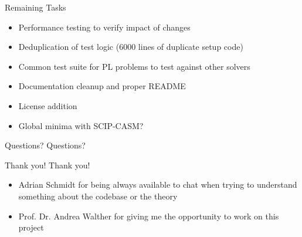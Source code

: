 \documentclass[aspectratio=169]{beamer}
\begin{document}
\begin{frame}{Remaining Tasks}
    \begin{itemize}[<+->]
        \item Performance testing to verify impact of changes
        \item Deduplication of test logic (6000 lines of duplicate setup code)
        \item Common test suite for PL problems to test against other solvers
        \item Documentation cleanup and proper README
        \item License addition
        \item Global minima with SCIP-CASM?
    \end{itemize}

\end{frame}

\begin{frame}{Questions?}
    \centering
    \vspace{2cm}
    \Huge Questions?
    \vspace{2cm}
\end{frame}

\begin{frame}{Thank you!}
    \centering
    \vspace{1cm}
    \Huge Thank you!
    \vspace{0.5cm}

    \large
    \begin{itemize}
        \item Adrian Schmidt for being always available to chat when trying to
              understand something about the codebase or the theory
        \item Prof. Dr. Andrea Walther for giving me the opportunity to work on
              this project
    \end{itemize}
    \vspace{1cm}
\end{frame}
\end{document}
